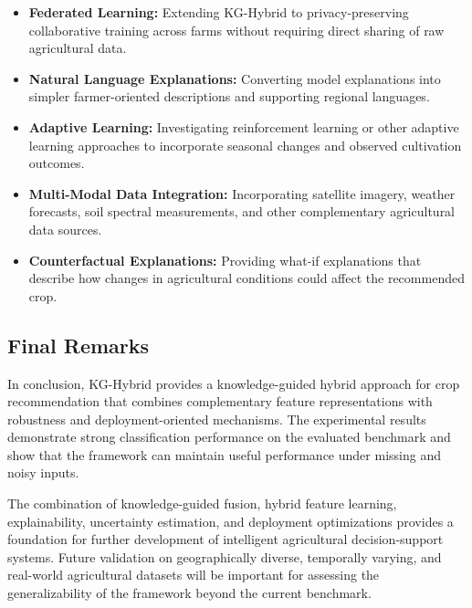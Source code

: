 \documentclass[journal]{IEEEtran}
\begin{document}
\begin{itemize}[leftmargin=1.2em]

    \item \textbf{Federated Learning:}
    Extending KG-Hybrid to privacy-preserving collaborative training across farms without requiring direct sharing of raw agricultural data.

    \item \textbf{Natural Language Explanations:}
    Converting model explanations into simpler farmer-oriented descriptions and supporting regional languages.

    \item \textbf{Adaptive Learning:}
    Investigating reinforcement learning or other adaptive learning approaches to incorporate seasonal changes and observed cultivation outcomes.

    \item \textbf{Multi-Modal Data Integration:}
    Incorporating satellite imagery, weather forecasts, soil spectral measurements, and other complementary agricultural data sources.

    \item \textbf{Counterfactual Explanations:}
    Providing what-if explanations that describe how changes in agricultural conditions could affect the recommended crop.

\end{itemize}


\subsection{Final Remarks}

In conclusion, KG-Hybrid provides a knowledge-guided hybrid approach for crop recommendation that combines complementary feature representations with robustness and deployment-oriented mechanisms. The experimental results demonstrate strong classification performance on the evaluated benchmark and show that the framework can maintain useful performance under missing and noisy inputs.

The combination of knowledge-guided fusion, hybrid feature learning, explainability, uncertainty estimation, and deployment optimizations provides a foundation for further development of intelligent agricultural decision-support systems. Future validation on geographically diverse, temporally varying, and real-world agricultural datasets will be important for assessing the generalizability of the framework beyond the current benchmark.
\end{document}
